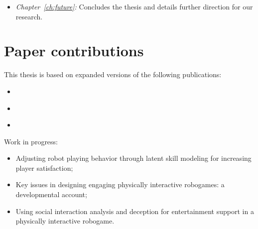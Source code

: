 \begin{itemize}
\item\emph{Chapter~\ref{ch:future}:} Concludes the thesis and details further direction for our research.
\end{itemize}

\section{Paper contributions}

This thesis is based on expanded versions of the following publications:

\begin{itemize}
    \item \cite{oliveira_learning_2018}
    \item \cite{oliveira_modeling_2017}
    \item \cite{oliveira_activity_2017}
\end{itemize}

Work in progress:

\begin{itemize}
\item Adjusting robot playing behavior through latent skill modeling for increasing player satisfaction;
\item Key issues in designing engaging physically interactive robogames: a developmental account;
\item Using social interaction analysis and deception for entertainment support in a physically interactive robogame.
\end{itemize}